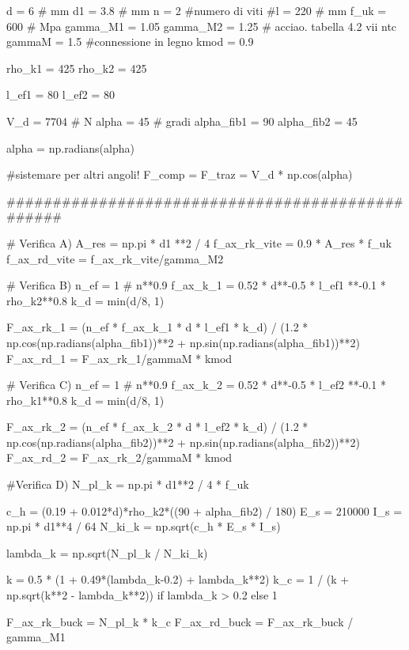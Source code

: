 \begin{pycode}[viti]
d = 6 # mm
d1 = 3.8 # mm
n = 2 #numero di viti
#l = 220 # mm 
f_uk = 600 # Mpa
gamma_M1 = 1.05
gamma_M2 = 1.25 # acciao. tabella 4.2 vii ntc
gammaM = 1.5 #connessione in legno 
kmod = 0.9

rho_k1 = 425
rho_k2 = 425

l_ef1 = 80
l_ef2 = 80

V_d = 7704 # N
alpha = 45 # gradi
alpha_fib1 = 90
alpha_fib2 = 45

alpha = np.radians(alpha)


#sistemare per altri angoli!
F_comp = F_traz = V_d * np.cos(alpha)

#################################################

# Verifica A)
A_res = np.pi * d1 **2 / 4
f_ax_rk_vite = 0.9 * A_res * f_uk 
f_ax_rd_vite = f_ax_rk_vite/gamma_M2

# Verifica B)
n_ef = 1 # n**0.9 
f_ax_k_1 = 0.52 * d**-0.5 * l_ef1 **-0.1 * rho_k2**0.8
k_d = min(d/8, 1)

F_ax_rk_1 = (n_ef * f_ax_k_1 * d * l_ef1 * k_d) / (1.2 * np.cos(np.radians(alpha_fib1))**2 + np.sin(np.radians(alpha_fib1))**2)
F_ax_rd_1 = F_ax_rk_1/gammaM * kmod

# Verifica C)
n_ef = 1 # n**0.9 
f_ax_k_2 = 0.52 * d**-0.5 * l_ef2 **-0.1 * rho_k1**0.8
k_d = min(d/8, 1)

F_ax_rk_2 = (n_ef * f_ax_k_2 * d * l_ef2 * k_d) / (1.2 * np.cos(np.radians(alpha_fib2))**2 + np.sin(np.radians(alpha_fib2))**2)
F_ax_rd_2 = F_ax_rk_2/gammaM * kmod

#Verifica D)
N_pl_k = np.pi * d1**2 / 4 * f_uk

c_h = (0.19 + 0.012*d)*rho_k2*((90 + alpha_fib2) / 180)
E_s = 210000
I_s = np.pi * d1**4 / 64
N_ki_k = np.sqrt(c_h * E_s * I_s)

lambda_k = np.sqrt(N_pl_k / N_ki_k)

k = 0.5 * (1 + 0.49*(lambda_k-0.2) + lambda_k**2)
k_c = 1 / (k + np.sqrt(k**2 - lambda_k**2)) if lambda_k > 0.2 else  1

F_ax_rk_buck = N_pl_k * k_c
F_ax_rd_buck = F_ax_rk_buck / gamma_M1
\end{pycode}
